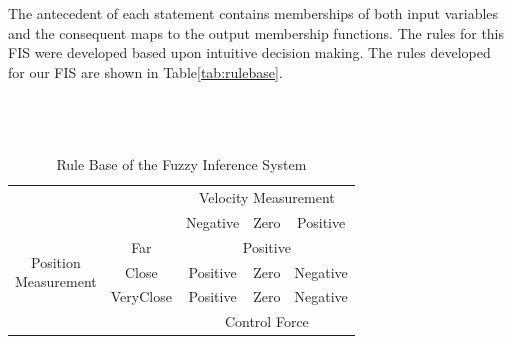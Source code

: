 \documentclass[submit]{aiaa-tc}%
\begin{document}
The antecedent of each statement contains memberships of both input variables and the consequent maps to the output membership functions. The rules for this FIS were developed based upon intuitive decision making. The rules developed for our FIS are shown in Table\vref{tab:rulebase}. 
\\
\\
\\
\\
\begin{table}[h]
	\begin{center}
	\caption{Rule Base of the Fuzzy Inference System}\label{tab:rulebase}
		\begin{tabular}{ccccc}
		\multicolumn{2}{c}{}  & \multicolumn{3}{c}{Velocity Measurement}\\ \cline{3-5} 
		\multicolumn{2}{c|}{}  & \multicolumn{1}{c|}{Negative} & \multicolumn{1}{c|}{Zero} & \multicolumn{1}{c|}{Positive} \\ \cline{2-5} 
		\multicolumn{1}{c|}{\multirow{3}{*}{\parbox{3cm}{\centering Position\\Measurement}}} & \multicolumn{1}{c|}{Far} & \multicolumn{3}{c|}{Positive} \\ \cline{2-5} 
		\multicolumn{1}{c|}{} & \multicolumn{1}{c|}{Close} & \multicolumn{1}{c|}{Positive} & \multicolumn{1}{c|}{Zero} & \multicolumn{1}{c|}{Negative}\\ \cline{2-5}
		\multicolumn{1}{c|}{} & \multicolumn{1}{c|}{VeryClose} & \multicolumn{1}{c|}{Positive} & \multicolumn{1}{c|}{Zero} & \multicolumn{1}{c|}{Negative} \\ \cline{2-5}
		\multicolumn{2}{c}{}  & \multicolumn{3}{c}{Control Force}
		\end{tabular}
	\end{center}
\end{table}
\end{document}
